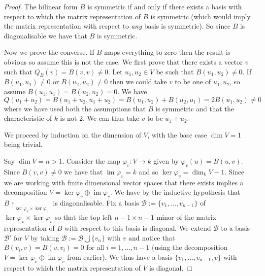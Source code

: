 \documentclass[12pt]{article}
\theoremstyle{plain}
\theoremstyle{definition}
\newcommand{\scr}[1]{\mathscr{#1}}
\newcommand{\lto}{\longrightarrow}
\begin{document}
\begin{proof}
	The bilinear form $B$ is symmetric if and only if there exists a basis with respect to which the matrix representation of $B$ is symmetric (which would imply the matrix representation with respect to \emph{any} basis is symmetric). So since $B$ is diagonalisable we have that $B$ is symmetric.
	
	Now we prove the converse. If $B$ maps everything to zero then the result is obvious so assume this is not the case. We first prove that there exists a vector $v$ such that $Q_B(v) = B(v,v) \neq 0$. Let $u_1,u_2 \in V$ be such that $B(u_1,u_2) \neq 0$. If $B(u_1,u_1) \neq 0$ or $B(u_2,u_2) \neq 0$ then we could take $v$ to be one of $u_1,u_2$, so assume $B(u_1,u_1) = B(u_2,u_2) = 0$. We have
	\begin{equation}
		Q(u_1 + u_2) = B(u_1 + u_2, u_1 + u_2) = B(u_1,u_2) + B(u_2,u_1) = 2B(u_1,u_2) \neq 0
	\end{equation}
	where we have used both the assumptions that $B$ is symmetric and that the characteristic of $k$ is not 2. We can thus take $v$ to be $u_1 + u_2$.
	
	We proceed by induction on the dimension of $V$, with the base case $\operatorname{dim}V = 1$ being trivial.
	
	Say $\operatorname{dim}V = n > 1$. Consider the map $\varphi_v: V \lto k$ given by $\varphi_v(u) = B(u,v)$. Since $B(v,v) \neq 0$ we have that $\operatorname{im}\varphi_v = k$ and so $\operatorname{ker}\varphi_v = \operatorname{dim}_kV - 1$. Since we are working with finite dimensional vector spaces that there exists implies a decomposition $V = \operatorname{ker}\varphi_v \oplus \operatorname{im}\varphi_v$. We have by the inductive hypothesis that $B\restriction_{\operatorname{ker}\varphi_v \times \operatorname{ker}\varphi_v}$ is diagonalisable. Fix a basis $\scr{B} := \lbrace v_1,...,v_{n-1}\rbrace$ of $\operatorname{ker}\varphi_v \times \operatorname{ker}\varphi_v$ so that the top left $n-1 \times n-1$ minor of the matrix representation of $B$ with respect to this basis is diagonal. We extend $\scr{B}$ to a basis $\scr{B}'$ for $V$ by taking $\scr{B} := \scr{B} \bigcup \lbrace v_n\rbrace$ with $v$ and notice that $B(v_i,v) = B(v,v_i) = 0$ for all $i = 1,...,n-1$ (using the decomposition $V = \operatorname{ker}\varphi_v \oplus \operatorname{im}\varphi_v$ from earlier). We thus have a basis $\lbrace v_1,...,v_{n-1},v\rbrace$ with respect to which the matrix representation of $V$ is diagonal.
\end{proof}
\end{document}
